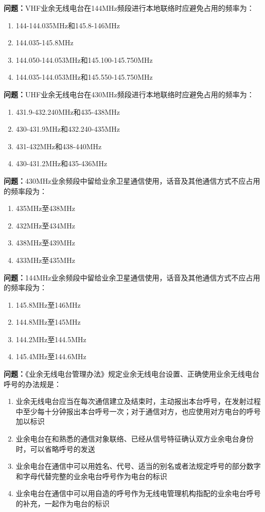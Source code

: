 \documentclass[UTF8]{ctexbook}
\begin{document}
\textbf{问题：}VHF业余无线电台在144MHz频段进行本地联络时应避免占用的频率为：
\begin{enumerate}[label=\Alph*), leftmargin=3em]
  \item 144-144.035MHz和145.8-146MHz
  \item 144.035-145.8MHz
  \item 144.050-144.053MHz和145.100-145.750MHz
  \item 144.035-144.053MHz和145.550-145.750MHz
\end{enumerate}

\textbf{问题：}UHF业余无线电台在430MHz频段进行本地联络时应避免占用的频率为：
\begin{enumerate}[label=\Alph*), leftmargin=3em]
  \item 431.9-432.240MHz和435-438MHz
  \item 430-431.9MHz和432.240-435MHz
  \item 431-432MHz和438-440MHz
  \item 430-431.2MHz和435-436MHz
\end{enumerate}

\textbf{问题：}430MHz业余频段中留给业余卫星通信使用，话音及其他通信方式不应占用的频率段为：
\begin{enumerate}[label=\Alph*), leftmargin=3em]
  \item 435MHz至438MHz
  \item 432MHz至434MHz
  \item 438MHz至439MHz
  \item 433MHz至435MHz
\end{enumerate}

\textbf{问题：}144MHz业余频段中留给业余卫星通信使用，话音及其他通信方式不应占用的频率段为：
\begin{enumerate}[label=\Alph*), leftmargin=3em]
  \item 145.8MHz至146MHz
  \item 144.8MHz至145MHz
  \item 144.2MHz至144.5MHz
  \item 145.4MHz至144.6MHz
\end{enumerate}

\textbf{问题：}《业余无线电台管理办法》规定业余无线电台设置、正确使用业余无线电台呼号的办法规是：
\begin{enumerate}[label=\Alph*), leftmargin=3em]
  \item 业余无线电台应当在每次通信建立及结束时，主动报出本台呼号，在发射过程中至少每十分钟报出本台呼号一次；对于通信对方，也应使用对方电台的呼号加以标识
  \item 业余电台在和熟悉的通信对象联络、已经从信号特征确认双方业余电台身份时，可以省略呼号的发送
  \item 业余电台在通信中可以用姓名、代号、适当的别名或者法规定呼号的部分数字和字母代替完整的业余电台呼号作为电台的标识
  \item 业余电台在通信中可以用自造的呼号作为无线电管理机构指配的业余电台呼号的补充，一起作为电台的标识
\end{enumerate}
\end{document}
